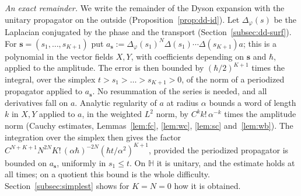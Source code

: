 \documentclass[twoside,10pt]{article}
\numberwithin{equation}{section}
\theoremstyle{slbody}
\theoremstyle{remark}
\newcommand{\Hb}{\mathbb{H}}
\begin{document}
\emph{An exact remainder.} We write the remainder of the Dyson expansion with the unitary propagator on the outside
(Proposition~\ref{prop:dd-id}). Let $\Delta_\varphi(s)$ be the Laplacian conjugated by the phase and the transport
(Section~\ref{subsec:dd-surf}).
For $\mathbf s=(s_1,\dots,s_{K+1})$ put $a_{\mathbf s}:=\Delta_\varphi(s_1)^N\Delta(s_1)\cdots\Delta(s_{K+1})a$; this is a
polynomial in the vector fields $X,Y$, with coefficients depending on $\mathbf s$ and $\hbar$, applied to the amplitude.
The error is then bounded by $(\hbar/2)^{K+1}$ times the integral, over the simplex $t>s_1>\dots>s_{K+1}>0$, of the norm of a
periodized propagator applied to $a_{\mathbf s}$. No resummation of the series is needed, and all derivatives fall on $a$. Analytic regularity of $a$ at radius
$\alpha$ bounds a word of length $k$ in $X,Y$ applied to $a$, in the weighted $L^2$ norm, by $C^kk!\,\alpha^{-k}$ times the
amplitude norm (Cauchy estimates,
Lemmas~\ref{lem:fc}, \ref{lem:wc}, \ref{lem:sc} and~\ref{lem:wb}). The integration over the simplex then gives the factor
$C^{N+K+1}N^{2N}K!\,(\alpha\hbar)^{-2N}(\hbar t/\alpha^2)^{K+1}$, provided the periodized propagator is bounded on $a_{\mathbf s}$,
uniformly in $s_1\le t$. On $\Hb$ it is unitary, and the estimate holds at all times; on a quotient this bound is the whole
difficulty. Section~\ref{subsec:simplest} shows for $K=N=0$ how it is obtained.
\end{document}
